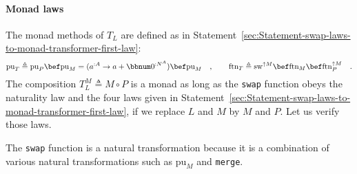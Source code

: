 \paragraph{Monad laws}

The monad methods of $T_{L}$ are defined as in Statement~\ref{sec:Statement-swap-laws-to-monad-transformer-first-law}:
\[
\text{pu}_{T}\triangleq\text{pu}_{P}\bef\text{pu}_{M}=(a^{:A}\rightarrow a+\bbnum 0^{:N^{A}})\bef\text{pu}_{M}\quad,\quad\quad\text{ftn}_{T}\triangleq\text{sw}^{\uparrow M}\bef\text{ftn}_{M}\bef\text{ftn}_{P}^{\uparrow M}\quad.
\]
The composition $T_{L}^{M}\triangleq M\circ P$ is a monad as long
as the \lstinline!swap! function obeys the naturality law and the
four laws given in Statement~\ref{sec:Statement-swap-laws-to-monad-transformer-first-law},
if we replace $L$ and $M$ by $M$ and $P$. Let us verify those
laws.

The \lstinline!swap! function is a natural transformation because
it is a combination of various natural transformations such as $\text{pu}_{M}$
and \lstinline!merge!.

